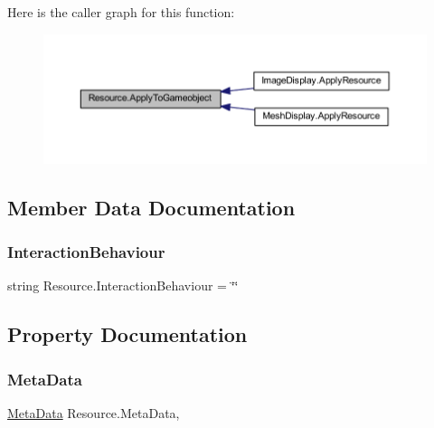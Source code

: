 Here is the caller graph for this function\+:
\nopagebreak
\begin{figure}[H]
\begin{center}
\leavevmode
\includegraphics[width=350pt]{class_resource_a2461ea96169926a858f02ebaf94157fb_icgraph}
\end{center}
\end{figure}


\subsection{Member Data Documentation}
\mbox{\label{class_resource_ae22d064310b77c0071076c8978b74b61}} 
\subsubsection{\texorpdfstring{Interaction\+Behaviour}{InteractionBehaviour}}
{\footnotesize\ttfamily string Resource.\+Interaction\+Behaviour = \char`\"{}\char`\"{}}



\subsection{Property Documentation}
\mbox{\label{class_resource_a081e2bc38733abfd0da66f18029a5555}} 
\subsubsection{\texorpdfstring{Meta\+Data}{MetaData}}
{\footnotesize\ttfamily \mbox{\hyperlink{class_meta_data}{Meta\+Data}} Resource.\+Meta\+Data\hspace{0.3cm}{\ttfamily [get]}, {}}

